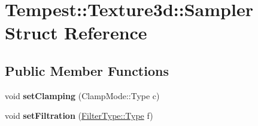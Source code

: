 \hypertarget{struct_tempest_1_1_texture3d_1_1_sampler}{\section{Tempest\+:\+:Texture3d\+:\+:Sampler Struct Reference}
\label{struct_tempest_1_1_texture3d_1_1_sampler}
}
\subsection*{Public Member Functions}
\begin{DoxyCompactItemize}
\item 
\hypertarget{struct_tempest_1_1_texture3d_1_1_sampler_af0c2af52ab78dbb71acdcb91cbed47e6}{void {\bfseries set\+Clamping} (Clamp\+Mode\+::\+Type c)}\label{struct_tempest_1_1_texture3d_1_1_sampler_af0c2af52ab78dbb71acdcb91cbed47e6}

\item 
\hypertarget{struct_tempest_1_1_texture3d_1_1_sampler_af9caf9a3c362fe72aaf048d7ac5de325}{void {\bfseries set\+Filtration} (\hyperlink{struct_tempest_1_1_abstract_texture_1_1_filter_type_aa28dcbdc63244fe43cfb7258f6996978}{Filter\+Type\+::\+Type} f)}\label{struct_tempest_1_1_texture3d_1_1_sampler_af9caf9a3c362fe72aaf048d7ac5de325}

\end{DoxyCompactItemize}
